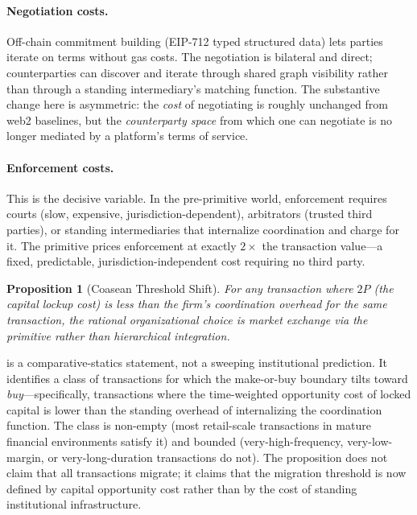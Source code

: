 \documentclass[11pt,a4paper]{article}
\newtheorem{proposition}[theorem]{Proposition}
\theoremstyle{definition}
\theoremstyle{remark}
\newcommand{\pay}{P}
\begin{document}
\paragraph{Negotiation costs.}
Off-chain commitment building (EIP-712 typed structured data) lets
parties iterate on terms without gas costs. The negotiation is
bilateral and direct; counterparties can discover and iterate through
shared graph visibility rather than through a standing intermediary's
matching function. The substantive change here is asymmetric: the
\emph{cost} of negotiating is roughly unchanged from web2 baselines,
but the \emph{counterparty space} from which one can negotiate is no
longer mediated by a platform's terms of service.

\paragraph{Enforcement costs.}
This is the decisive variable. In the pre-primitive world, enforcement
requires courts (slow, expensive, jurisdiction-dependent), arbitrators
(trusted third parties), or standing intermediaries that internalize
coordination and charge for it. The primitive prices enforcement at
exactly $2\times$ the transaction value---a fixed, predictable,
jurisdiction-independent cost requiring no third party.

\begin{proposition}[Coasean Threshold Shift]
\label{prop:coasean-shift}
For any transaction where $2\pay$ (the capital lockup cost) is less
than the firm's coordination overhead for the same transaction, the
rational organizational choice is market exchange via the primitive
rather than hierarchical integration.
\end{proposition}

 is a comparative-statics statement, not a
sweeping institutional prediction. It identifies a class of
transactions for which the make-or-buy boundary tilts toward
\emph{buy}---specifically, transactions where the time-weighted
opportunity cost of locked capital is lower than the standing
overhead of internalizing the coordination function. The class is
non-empty (most retail-scale transactions in mature financial
environments satisfy it) and bounded (very-high-frequency, very-low-margin,
or very-long-duration transactions do not). The proposition does not
claim that all transactions migrate; it claims that the migration
threshold is now defined by capital opportunity cost rather than by
the cost of standing institutional infrastructure.
\end{document}
